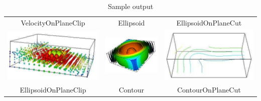 \begin{table}[ht]
\begin{tabular}{c c c}
VelocityOnPlaneClip & Ellipsoid & EllipsoidOnPlaneCut \\
\includegraphics[width=\thumbnailwidth]{figures/EllipsoidOnPlaneClip} & 
\includegraphics[width=\thumbnailwidth]{figures/Contour} & 
\includegraphics[width=\thumbnailwidth]{figures/ContourOnPlaneCut}  \\
EllipsoidOnPlaneClip & Contour & ContourOnPlaneCut \\
\end{tabular}
\caption{Sample output}
\end{table}

